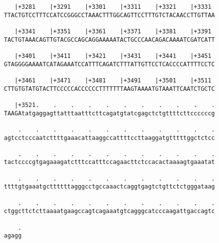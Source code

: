\documentclass{article}
\begin{document}
\begin{Verbatim}
   |+3281    |+3291    |+3301    |+3311    |+3321    |+3331 
TTACTGTCCTTTCCATCCGGGCCTAAACTTTGGCAGTTCCTTTGTCTACAACCTTGTTAA
                                                            
   |+3341    |+3351    |+3361    |+3371    |+3381    |+3391 
TACTGTAAACAGTTGTACGCCAGCAGGAAAAATACTGCCCAACAGACAAAATCGATCATT
                                                            
   |+3401    |+3411    |+3421    |+3431    |+3441    |+3451 
GTAGGGGAAAATCATAGAAATCCATTTCAGATCTTTATTGTTCCTCACCCCATTTTCCTC
                                                            
   |+3461    |+3471    |+3481    |+3491    |+3501    |+3511 
CTTGTGTATGTACTTCCCCCACCCCCCTTTTTTTAAGTAAAATGTAAATTCAATCTGCTC
                                                            
   |+3521.    .    .    .    .    .    .    .    .    .    .
TAAGAtatgaggagttatttaatttcttcagatgtatcgagctctgttttcttccccccg
                                                            
    .    .    .    .    .    .    .    .    .    .    .    .
agtcctcccaatcttttgaaacattaaggccattttccttaaggatgtttttggctctcc
                                                            
    .    .    .    .    .    .    .    .    .    .    .    .
tactccccgtgagaaagatctttccatttccagaacttctccacactaaaagtgaaatat
                                                            
    .    .    .    .    .    .    .    .    .    .    .    .
ttttgtgaaatgcttttttagggcctgccaaactcaggtgagtctgttctctgggataag
                                                            
    .    .    .    .    .    .    .    .    .    .    .    .
ctggcttctcttaaaatgaagccagtcagaaatgtcagggcatcccaagattgaccagtc
                                                            
    .
agagg
     
     
\end{Verbatim}
\end{document}
